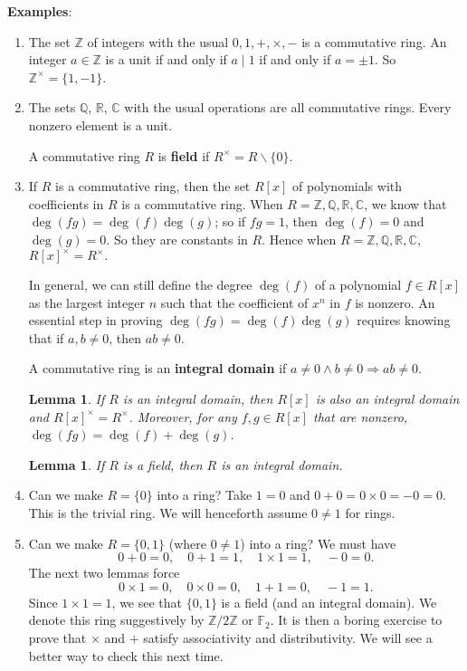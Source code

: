 \documentclass{article}
\def\Z{{\mathbb Z}}
\def\R{{\mathbb R}}
\def\F{{\mathbb F}}
\def\Q{{\mathbb Q}}
\def\Z{{\mathbb Z}}
\def\F{{\mathbb F}}
\def\Q{{\mathbb Q}}
\def\C{{\mathbb C}}
\newtheorem{lemma}[subsection]{Lemma}
\begin{document}
\noindent\textbf{Examples}:
\begin{enumerate}
    \item The set $\Z$ of integers with the usual $0,1,+,\times,-$ is a commutative ring. An integer $a\in\Z$ is a unit if and only if $a\mid 1$ if and only if $a = \pm 1$. So $\Z^\times = \{1,-1\}$.
    \item The sets $\Q$, $\R$, $\C$ with the usual operations are all commutative rings. Every nonzero element is a unit.

    A commutative ring $R$ is \textbf{field} if $R^\times = R \backslash \{0\}.$
    \item If $R$ is a commutative ring, then the set $R[x]$ of polynomials with coefficients in $R$ is a commutative ring. When $R = \Z,\Q,\R,\C$, we know that $\deg(fg) = \deg(f)\deg(g)$; so if $fg = 1$, then $\deg(f) = 0$ and $\deg(g) = 0$. So they are constants in $R$. Hence when $R = \Z,\Q,\R,\C$, $R[x]^\times = R^\times.$

    In general, we can still define the degree $\deg(f)$ of a polynomial $f\in R[x]$ as the largest integer $n$ such that the coefficient of $x^n$ in $f$ is nonzero. An essential step in proving $\deg(fg) = \deg(f)\deg(g)$ requires knowing that if $a,b\neq0$, then $ab\neq 0$.

    A commutative ring is an \textbf{integral domain} if $a\neq 0\wedge b\neq 0\Rightarrow ab\neq 0$.

    \begin{lemma}\label{lem:degfg}
        If $R$ is an integral domain, then $R[x]$ is also an integral domain and $R[x]^\times = R^\times$. Moreover, for any $f,g\in R[x]$ that are nonzero, $\deg(fg) = \deg(f) + \deg(g)$.
    \end{lemma}

    \begin{lemma}\label{lem:fieldid}
        If $R$ is a field, then $R$ is an integral domain.
    \end{lemma}

    \item Can we make $R = \{0\}$ into a ring? Take $1 = 0$ and $0+0=0\times0 = -0 = 0.$ This is the trivial ring. We will henceforth assume $0\neq 1$ for rings.

    \item Can we make $R = \{0,1\}$ (where $0\neq 1$) into a ring? We must have $$0+0 = 0,\quad 0 + 1 = 1, \quad 1\times 1 = 1,\quad -0 = 0.$$
    The next two lemmas force $$0\times 1 = 0,\quad 0\times 0 = 0,\quad 1 + 1 = 0,\quad -1 = 1.$$ Since $1\times 1 = 1$, we see that $\{0,1\}$ is a field (and an integral domain). We denote this ring suggestively by $\Z/2\Z$ or $\F_2$. It is then a boring exercise to prove that $\times$ and $+$ satisfy associativity and distributivity. We will see a better way to check this next time.


\end{enumerate}
\end{document}

